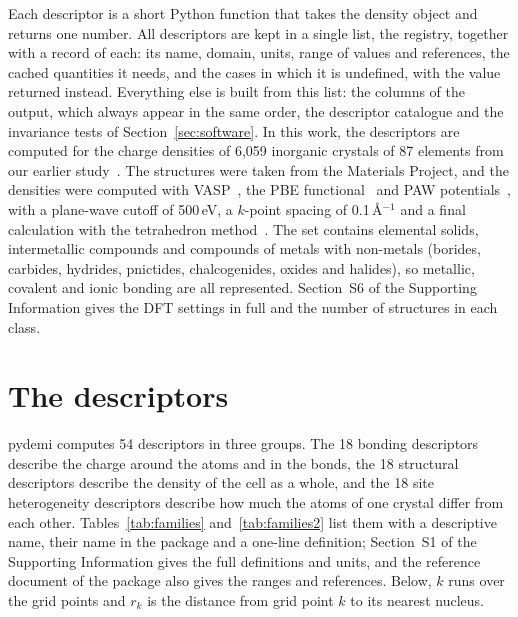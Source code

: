 \documentclass[journal=jctcce,manuscript=article,email=true]{achemso}
\newcommand{\rev}[1]{{\color{blue}#1}}
\begin{document}
Each descriptor is a short Python function that takes the density object and
returns one number. All descriptors are kept in a single list, the registry,
together with a record of each: its name, domain, units, range of values and
references, the cached quantities it needs, and the cases in which
it is undefined, with the value returned instead. Everything else is built from
this list: the columns of the output, which always appear in the same order, the
descriptor catalogue and the invariance tests of Section~\ref{sec:software}.
In this work, the descriptors are computed for the charge densities of 6,059
inorganic crystals of 87 elements from our earlier study~\cite{kumar2026}. The
structures were taken from the Materials Project, and the densities were
computed with VASP~\rev{\cite{kresse1996,kresse1996cms}}, the PBE functional~\cite{perdew1996} and
PAW potentials~\cite{blochl1994,kresse1999}, with a plane-wave cutoff of
500\,eV, a $k$-point spacing of 0.1\,\AA$^{-1}$ and a final calculation with the
tetrahedron method\rev{~\cite{blochl1994tetra}}. The set contains elemental solids, intermetallic compounds
and compounds of metals with non-metals (borides, carbides, hydrides,
pnictides, chalcogenides, oxides and halides), so metallic, covalent and ionic
bonding are all represented. Section~S6 of the Supporting Information gives the
DFT settings in full and the number of structures in each class.

\section{The descriptors}
\label{sec:descriptors}

pydemi computes \rev{54} descriptors in three groups. The 18 bonding descriptors
describe the charge around the atoms and in the bonds, the \rev{18} structural
descriptors describe the density of the cell as a whole, and the 18 site
heterogeneity descriptors describe how much the atoms of one crystal differ
from each other. Tables~\ref{tab:families} and~\ref{tab:families2} list them
with a descriptive name, their name in the package and a one-line definition;
Section~S1 of the Supporting Information gives the full definitions and
units, and the reference document of the package also gives the ranges and
references. Below, $k$
runs over the grid points and $r_k$ is the distance from grid point $k$ to its
nearest nucleus.
\end{document}
